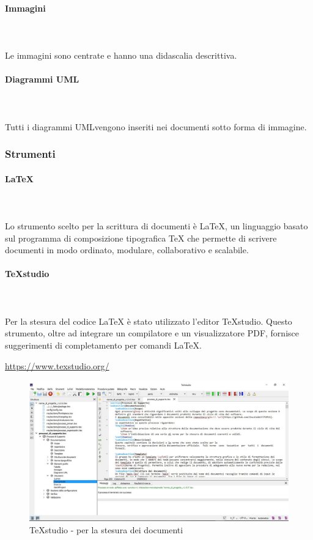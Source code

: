 		\paragraph{Immagini} \mbox{}\\ \mbox{}\\
		Le immagini sono centrate e hanno una didascalia descrittiva. 
		\paragraph{Diagrammi UML} \mbox{}\\ \mbox{}\\
		Tutti i diagrammi UML\glosp vengono inseriti nei documenti sotto forma di immagine.
	\subsubsection{Strumenti}
		\paragraph{\LaTeX} \mbox{}\\ \mbox{}\\
		Lo strumento scelto per la scrittura di documenti è \LaTeX{}, un linguaggio basato sul programma di composizione tipografica \TeX{} che permette di scrivere documenti in modo ordinato, modulare, collaborativo e scalabile.
		\paragraph{\TeX{}studio} \mbox{}\\ \mbox{}\\
		Per la stesura del codice \LaTeX{} è stato utilizzato l'editor \TeX{}studio. Questo strumento, oltre ad integrare un compilatore e un visualizzatore PDF, fornisce suggerimenti di completamento per comandi \LaTeX{}. \newline
		\centerline{\url{https://www.texstudio.org/}}
		\begin{figure}[H]
			\includegraphics[width=1\linewidth]{res/images/latex2.jpg}
			\caption{\TeX{}studio - per la stesura dei documenti}
		\end{figure} 
